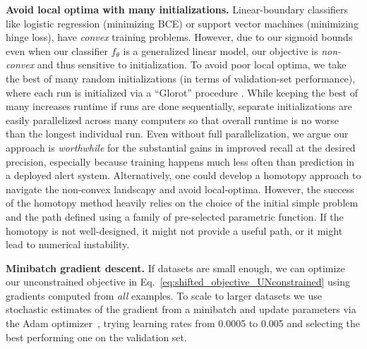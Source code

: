 \textbf{Avoid local optima with many initializations.}
Linear-boundary classifiers like logistic regression (minimizing BCE) or support vector machines (minimizing hinge loss), have \emph{convex} training problems.
However, due to our sigmoid bounds even when our classifier $f_{\theta}$ is a generalized linear model, our objective is \emph{non-convex} and thus sensitive to initialization.
To avoid poor local optima, we take the best of many random initializations (in terms of validation-set performance), where each run is initialized via a ``Glorot'' procedure \citep{glorot2010understanding}.
While keeping the best of many increases runtime if runs are done sequentially, 
separate initializations are easily parallelized across many computers so that overall runtime is no worse than the longest individual run.
Even without full parallelization, we argue our approach is \emph{worthwhile} for the substantial gains in improved recall at the desired precision, especially because training happens much less often than prediction in a deployed alert system. Alternatively, one could develop a homotopy approach \citep{watson1989globally} to navigate the non-convex landscapy and avoid local-optima. However, the success of the homotopy method heavily relies on the choice of the initial simple problem and the path defined using a family of pre-selected parametric function. If the homotopy is not well-designed, it might not provide a useful path, or it might lead to numerical instability.


\textbf{Minibatch gradient descent.}
If datasets are small enough, we can optimize our unconstrained objective in Eq.~\eqref{eq:shifted_objective_UNconstrained} using gradients computed from \emph{all} examples.
To scale to larger datasets we use stochastic estimates of the gradient from a minibatch and update parameters via the Adam optimizer~\citep{kingmaAdamMethodStochastic2014}, trying learning rates from 0.0005 to 0.005 and selecting the best performing one on the validation set. 

